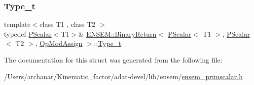\subsubsection{\texorpdfstring{Type\_t}{Type\_t}\hspace{0.1cm}{\footnotesize\ttfamily [3/3]}}
{\footnotesize\ttfamily template$<$class T1 , class T2 $>$ \\
typedef \mbox{\hyperlink{classENSEM_1_1PScalar}{P\+Scalar}}$<$T1$>$\& \mbox{\hyperlink{structENSEM_1_1BinaryReturn}{E\+N\+S\+E\+M\+::\+Binary\+Return}}$<$ \mbox{\hyperlink{classENSEM_1_1PScalar}{P\+Scalar}}$<$ T1 $>$, \mbox{\hyperlink{classENSEM_1_1PScalar}{P\+Scalar}}$<$ T2 $>$, \mbox{\hyperlink{structENSEM_1_1OpModAssign}{Op\+Mod\+Assign}} $>$\+::\mbox{\hyperlink{structENSEM_1_1BinaryReturn_3_01PScalar_3_01T1_01_4_00_01PScalar_3_01T2_01_4_00_01OpModAssign_01_4_a5881ef2b7460fedecc7cdf20e5f36799}{Type\+\_\+t}}}



The documentation for this struct was generated from the following file\+:\begin{DoxyCompactItemize}
\item 
/\+Users/archanar/\+Kinematic\+\_\+factor/adat-\/devel/lib/ensem/\mbox{\hyperlink{adat-devel_2lib_2ensem_2ensem__primscalar_8h}{ensem\+\_\+primscalar.\+h}}\end{DoxyCompactItemize}
